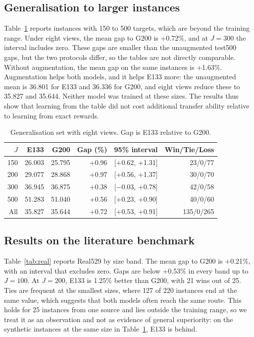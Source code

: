 \documentclass[preprint,12pt,authoryear]{elsarticle}
\begin{document}
\subsection{Generalisation to larger instances}

Table~\ref{tab:gen} reports instances with 150 to 500 targets, which are beyond the training range. Under eight views, the mean gap to G200 is +0.72\%, and at $J = 300$ the interval includes zero. These gaps are smaller than the unaugmented test500 gaps, but the two protocols differ, so the tables are not directly comparable. Without augmentation, the mean gap on the same instances is +1.63\%. Augmentation helps both models, and it helps E133 more: the unaugmented mean is 36.801 for E133 and 36.336 for G200, and eight views reduce these to 35.827 and 35.644. Neither model was trained at these sizes. The results thus show that learning from the table did not cost additional transfer ability relative to learning from exact rewards.

\begin{table}[t]
\centering
\caption{Generalisation set with eight views. Gap is E133 relative to G200.}
\label{tab:gen}
\small
\begin{tabular}{rrrrrr}
\toprule
$J$ & E133 & G200 & Gap (\%) & 95\% interval & Win/Tie/Loss \\
\midrule
150 & 26.003 & 25.795 & +0.96 & [+0.62, +1.31] & 23/0/77 \\
200 & 29.077 & 28.868 & +0.97 & [+0.56, +1.37] & 30/0/70 \\
300 & 36.945 & 36.875 & +0.38 & [$-$0.03, +0.78] & 42/0/58 \\
500 & 51.283 & 51.040 & +0.56 & [+0.23, +0.90] & 40/0/60 \\
All & 35.827 & 35.644 & +0.72 & [+0.53, +0.91] & 135/0/265 \\
\bottomrule
\end{tabular}
\end{table}

\subsection{Results on the literature benchmark}

Table~\ref{tab:real} reports Real529 by size band. The mean gap to G200 is +0.21\%, with an interval that excludes zero. Gaps are below +0.53\% in every band up to $J = 100$. At $J = 200$, E133 is 1.25\% better than G200, with 21 wins out of 25. Ties are frequent at the smallest sizes, where 127 of 220 instances end at the same value, which suggests that both models often reach the same route. This holds for 25 instances from one source and lies outside the training range, so we treat it as an observation and not as evidence of general superiority: on the synthetic instances at the same size in Table~\ref{tab:gen}, E133 is behind.
\end{document}

